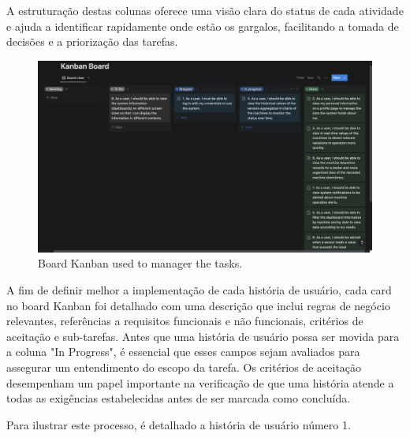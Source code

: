 A estruturação destas colunas oferece uma visão clara do status de cada atividade e ajuda a identificar rapidamente onde estão os gargalos, facilitando a tomada de decisões e a priorização das tarefas.

\begin{figure}[htbp]
	\centering
	\includegraphics[width=\textwidth]{images/kanban_board}
	\caption{Board Kanban used to manager the tasks.}
	\label{fig:BoardKanban}
\end{figure}

A fim de definir melhor a implementação de cada história de usuário, cada card no board Kanban foi detalhado com uma descrição que inclui regras de negócio relevantes, referências a requisitos funcionais e não funcionais, critérios de aceitação e sub-tarefas. Antes que uma história de usuário possa ser movida para a coluna "In Progress", é essencial que esses campos sejam avaliados para assegurar um entendimento do escopo da tarefa. Os critérios de aceitação desempenham um papel importante na verificação de que uma história atende a todas as exigências estabelecidas antes de ser marcada como concluída.

Para ilustrar este processo, é detalhado a história de usuário número 1.

